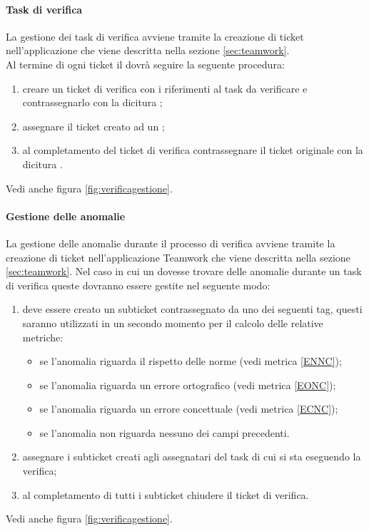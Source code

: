             \paragraph{Task di verifica}\label{sec:taskverifica}
            La gestione dei task di verifica avviene tramite la creazione di ticket nell'applicazione  che viene descritta nella sezione \ref{sec:teamwork}. \\
	        Al termine di ogni ticket il \responsabilediprogetto{} dovrà seguire la seguente procedura:
            \begin{enumerate}
                \item creare un ticket di verifica con i riferimenti al task da verificare e contrassegnarlo con la dicitura \cit{[VERIFICA]};
                \item assegnare il ticket creato ad un \verificatore;
                \item al completamento del ticket di verifica contrassegnare il ticket originale con la dicitura \cit{[VERIFICATO]}.
            \end{enumerate}
            Vedi anche figura \ref{fig:verificagestione}. \\

            \paragraph{Gestione delle anomalie}\label{sec:gestioneanomalie}
            La gestione delle anomalie durante il processo di verifica avviene tramite la creazione di ticket nell'applicazione Teamwork che viene descritta nella sezione \ref{sec:teamwork}. Nel caso in cui un \verificatore{} dovesse trovare delle anomalie durante un task di verifica queste dovranno essere gestite nel seguente modo:
            \begin{enumerate}
                \item deve essere creato un subticket contrassegnato da uno dei seguenti tag, questi saranno utilizzati in un secondo momento per il calcolo delle relative metriche:
                \begin{itemize}
                	\item \cit{[EN]} se l'anomalia riguarda il rispetto delle norme (vedi metrica \ref{ENNC});
                	\item \cit{[EO]} se l'anomalia riguarda un errore ortografico (vedi metrica \ref{EONC});
                	\item \cit{[EC]} se l'anomalia riguarda un errore concettuale (vedi metrica \ref{ECNC});
                	\item \cit{[ERR]} se l'anomalia non riguarda nessuno dei campi precedenti.
                \end{itemize}
                \item assegnare i subticket creati agli assegnatari del task di cui si sta eseguendo la verifica;
                \item al completamento di tutti i subticket chiudere il ticket di verifica.
            \end{enumerate}
            Vedi anche figura \ref{fig:verificagestione}.

